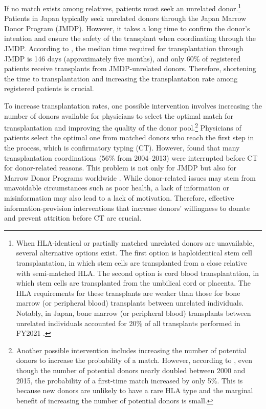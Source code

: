 \documentclass[12pt, a4paper]{article}
\begin{document}
If no match exists among relatives, patients must seek an unrelated donor.\footnote{When HLA-identical or partially matched unrelated donors are unavailable, several alternative options exist. The first option is haploidentical stem cell transplantation, in which stem cells are transplanted from a close relative with semi-matched HLA. The second option is cord blood transplantation, in which stem cells are transplanted from the umbilical cord or placenta. The HLA requirements for these transplants are weaker than those for bone marrow (or peripheral blood) transplants between unrelated individuals. Notably, in Japan, bone marrow (or peripheral blood) transplants between unrelated individuals accounted for 20\% of all transplants performed in FY2021 \citep{JapaneseDataCenterf2022}.} Patients in Japan typically seek unrelated donors through the Japan Marrow Donor Program (JMDP). However, it takes a long time to confirm the donor's intention and ensure the safety of the transplant when coordinating through the JMDP. According to \citet{Hirakawa2018}, the median time required for transplantation through JMDP is 146 days (approximately five months), and only 60\% of registered patients receive transplants from JMDP-unrelated donors. Therefore, shortening the time to transplantation and increasing the transplantation rate among registered patients is crucial.

To increase transplantation rates, one possible intervention involves increasing the number of donors available for physicians to select the optimal match for transplantation and improving the quality of the donor pool.\footnote{Another possible intervention includes increasing the number of potential donors to increase the probability of a match. However, according to \citet{Takanashi2016}, even though the number of potential donors nearly doubled between 2000 and 2015, the probability of a first-time match increased by only 5\%. This is because new donors are unlikely to have a rare HLA type and the marginal benefit of increasing the number of potential donors is small.} Physicians of patients select the optimal one from matched donors who reach the first step in the process, which is confirmatory typing (CT). However, \citet{Hirakawa2018} found that many transplantation coordinations (56\% from 2004--2013) were interrupted before CT for donor-related reasons. This problem is not only for JMDP but also for Marrow Donor Programs worldwide \citep{Haylock2024}. While donor-related issues may stem from unavoidable circumstances such as poor health, a lack of information or misinformation may also lead to a lack of motivation. Therefore, effective information-provision interventions that increase donors' willingness to donate and prevent attrition before CT are crucial.
\end{document}
